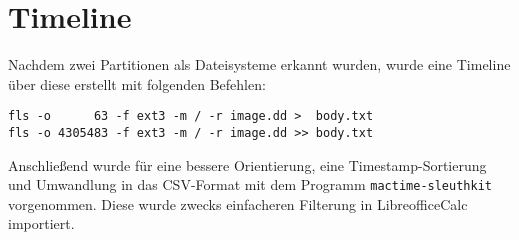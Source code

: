 \section{Timeline}
Nachdem zwei Partitionen als Dateisysteme erkannt wurden, wurde eine Timeline über diese erstellt mit folgenden Befehlen:
\begin{verbatim}
fls -o      63 -f ext3 -m / -r image.dd >  body.txt
fls -o 4305483 -f ext3 -m / -r image.dd >> body.txt
\end{verbatim}
Anschließend wurde für eine bessere Orientierung, eine Timestamp-Sortierung und Umwandlung in das CSV-Format mit dem Programm \texttt{mactime-sleuthkit} vorgenommen. Diese wurde zwecks einfacheren Filterung in LibreofficeCalc importiert.
\lstset{basicstyle=\footnotesize, breaklines=true, breakatwhitespace=true}
